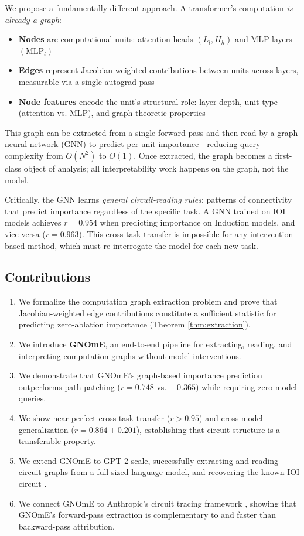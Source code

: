 \documentclass[11pt,a4paper]{article}
\begin{document}
We propose a fundamentally different approach. A transformer's computation \emph{is already a graph}:
\begin{itemize}[leftmargin=*]
    \item \textbf{Nodes} are computational units: attention heads $(L_l, H_h)$ and MLP layers $(\text{MLP}_l)$
    \item \textbf{Edges} represent Jacobian-weighted contributions between units across layers, measurable via a single autograd pass
    \item \textbf{Node features} encode the unit's structural role: layer depth, unit type (attention vs. MLP), and graph-theoretic properties
\end{itemize}

This graph can be extracted from a single forward pass and then read by a graph neural network (GNN) to predict per-unit importance---reducing query complexity from $O(N^2)$ to $O(1)$. Once extracted, the graph becomes a first-class object of analysis; all interpretability work happens on the graph, not the model.

Critically, the GNN learns \emph{general circuit-reading rules}: patterns of connectivity that predict importance regardless of the specific task. A GNN trained on IOI models achieves $r = 0.954$ when predicting importance on Induction models, and vice versa ($r = 0.963$). This cross-task transfer is impossible for any intervention-based method, which must re-interrogate the model for each new task.

\subsection{Contributions}

\begin{enumerate}[leftmargin=*]
    \item We formalize the computation graph extraction problem and prove that Jacobian-weighted edge contributions constitute a sufficient statistic for predicting zero-ablation importance (Theorem \ref{thm:extraction}).
    \item We introduce \textbf{GNOmE}, an end-to-end pipeline for extracting, reading, and interpreting computation graphs without model interventions.
    \item We demonstrate that GNOmE's graph-based importance prediction outperforms path patching ($r = 0.748$ vs.\ $-0.365$) while requiring zero model queries.
    \item We show near-perfect cross-task transfer ($r > 0.95$) and cross-model generalization ($r = 0.864 \pm 0.201$), establishing that circuit structure is a transferable property.
    \item We extend GNOmE to GPT-2 scale, successfully extracting and reading circuit graphs from a full-sized language model, and recovering the known IOI circuit \cite{wang2023interpretability}.
    \item We connect GNOmE to Anthropic's circuit tracing framework \cite{anthropic2025circuit}, showing that GNOmE's forward-pass extraction is complementary to and faster than backward-pass attribution.
\end{enumerate}
\end{document}
